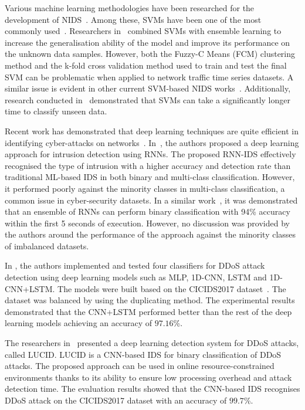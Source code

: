 \documentclass[runningheads]{llncs}
\begin{document}
Various machine learning methodologies have been researched for the development of \ac{NIDS}~\cite{ASHFAQ2017484,GUO2016391,KIM20141690}. Among these, \acp{SVM} have been one of the most commonly used~\cite{CHITRAKAR2014231,GU2021102158,GU201953}. Researchers in~\cite{CHITRAKAR2014231} combined \acp{SVM} with ensemble learning to increase the generalisation ability of the model and improve its performance on the unknown data samples. However, both the Fuzzy-C Means (FCM) clustering method and the k-fold cross validation method used to train and test the final \ac{SVM} can be problematic when applied to network traffic time series datasets. A similar issue is evident in other current \ac{SVM}-based \ac{NIDS} works~\cite{GU2021102158}. Additionally, research conducted in~\cite{AnthiEirini} demonstrated that \acp{SVM} can take a significantly longer time to classify unseen data.

Recent work has demonstrated that deep learning techniques are quite efficient in identifying cyber-attacks on networks~\cite{Singlaan}. In~\cite{Yin}, the authors proposed a deep learning approach for intrusion detection using \acp{RNN}. The proposed \ac{RNN}-\ac{IDS} effectively recognised the type of intrusion with a higher accuracy and detection rate than traditional ML-based \ac{IDS} in both binary and multi-class classification. However, it performed poorly against the minority classes in multi-class classification, a common issue in cyber-security datasets. In a similar work~\cite{RHODE2018578}, it was demonstrated that an ensemble of \acp{RNN} can perform binary classification with 94\% accuracy within the first 5 seconds of execution. However, no discussion was provided by the authors around the performance of the approach against the minority classes of imbalanced datasets. 

In \cite{1D-CNN-LSTM}, the authors implemented and tested four classifiers for \ac{DDoS} attack detection using deep learning models such as MLP, 1D-\ac{CNN}, LSTM and 1D-\ac{CNN}+LSTM. The models were built based on the CICIDS2017 dataset~\cite{Sharafaldin}. The dataset was balanced by using the duplicating method. The experimental results demonstrated that the \ac{CNN}+LSTM performed better than the rest of the deep learning models achieving an accuracy of $97.16$\%.

The researchers in~\cite{LUCID} presented a deep learning detection system for \ac{DDoS} attacks, called LUCID. LUCID is a \ac{CNN}-based \ac{IDS} for binary classification of \ac{DDoS} attacks. The proposed approach can be used in online resource-constrained environments thanks to its ability to ensure low processing overhead and attack detection time. The evaluation results showed that the \ac{CNN}-based \ac{IDS} recognises \ac{DDoS} attack on the CICIDS2017 dataset with an accuracy of $99.7$\%.
\end{document}
